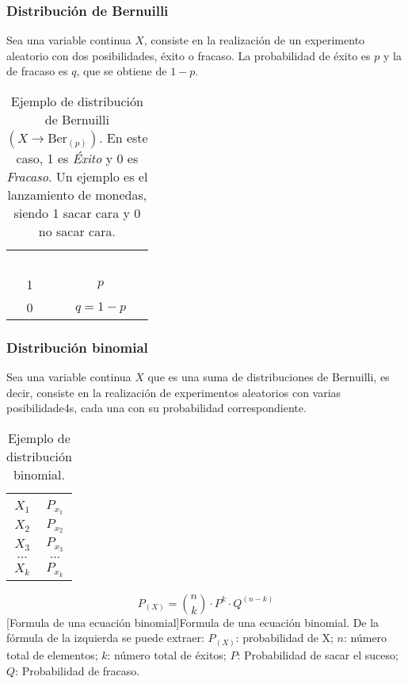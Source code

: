 \subsubsection{Distribución de Bernuilli}
Sea una variable continua $X$, consiste en la realización de un experimento aleatorio con dos posibilidades, éxito o fracaso. La probabilidad de éxito es $p$ y la de fracaso es $q$, que se obtiene de $1-p$. 
\begin{table}[H]
    \begin{tabular}{cc}
        \rowcolor{black}\textcolor{white}{\textbf{Valor}}&\textcolor{white}{\textbf{Probabilidad}}\\
        1&$p$\\
        \rowcolor{hiperlightgray}0&$q = 1-p$\\
        \hline
    \end{tabular}
    \caption[Ejemplo de distribución de Bernuilli]{Ejemplo de distribución de Bernuilli $\left( X\rightarrow \mbox{Ber}_{\left( p\right)} \right)$. En este caso, 1 es \textit{Éxito} y 0 es \textit{Fracaso}. Un ejemplo es el lanzamiento de monedas, siendo 1 sacar cara y 0 no sacar cara.}
\end{table}
\subsubsection{Distribución binomial}
Sea una variable continua $X$ que es una suma de distribuciones de Bernuilli, es decir, consiste en la realización de experimentos aleatorios con varias posibilidade4s, cada una con su probabilidad correspondiente.
\begin{multicols}{2}
    \begin{table}[H]
        \begin{tabular}{cc}
            \cellcolor[HTML]{000000}{\color[HTML]{FFFFFF} Valor} & \cellcolor[HTML]{000000}{\color[HTML]{FFFFFF} Probabilidad}  \\
            $X_1$ & $P_{x_1}$   \\
            \rowcolor{hiperlightgray}$X_2$ & $P_{x_2}$   \\
            $X_3$ & $P_{x_3}$   \\
            \rowcolor{hiperlightgray}$\dots$ & $\dots$  \\
            $X_k$ & $P_{x_k}$ \\
            \hline
        \end{tabular}
        \caption[Ejemplo de distribución binomial]{Ejemplo de distribución binomial.}
    \end{table}
    \columnbreak
    \begin{center}
        \begin{equation}
            P_{\left( X\right) } = {n \choose k}\cdot P^k\cdot Q^{\left(  n-k\right) }
        \end{equation}
        [Formula de una ecuación binomial]{Formula de una ecuación binomial. De la fórmula de la izquierda se puede extraer: $P_{\left( X \right) }$: probabilidad de X; $n$: número total de elementos; $k$: número total de éxitos; $P$: Probabilidad de sacar el suceso; $Q$: Probabilidad de fracaso.}
    \end{center}
\end{multicols}
